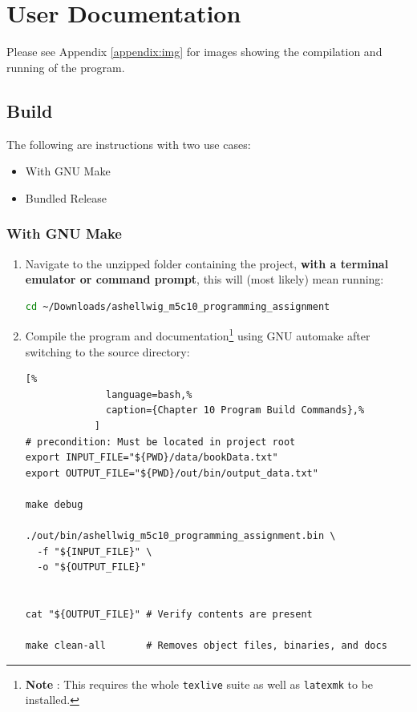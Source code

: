 \documentclass[a4paper, 11pt]{article}
\theoremstyle{definition}
\theoremstyle{plain}
\begin{document}
     


  \newpage
  \section{User Documentation}
    Please see Appendix \ref{appendix:img} for images showing the compilation
      and running of the program.

    \subsection{Build}
      The following are instructions with two use cases:
      \begin{itemize}
        \item With GNU Make
        \item Bundled Release
      \end{itemize}
      \subsubsection{With GNU Make}
        \begin{enumerate}
          \item Navigate to the unzipped folder containing the project,
            \textbf{with a terminal emulator or command prompt}, this will
            (most likely) mean running:
            \begin{lstlisting}[language=bash]
cd ~/Downloads/ashellwig_m5c10_programming_assignment
            \end{lstlisting}
          \item Compile the program and documentation\footnote{\textbf{Note%
            }: This requires the whole \texttt{texlive} suite as well as
            \texttt{latexmk} to be installed.} using GNU automake after
            switching to the source directory:
            \begin{lstlisting}[%
              language=bash,%
              caption={Chapter 10 Program Build Commands},%
            ]
# precondition: Must be located in project root
export INPUT_FILE="${PWD}/data/bookData.txt"
export OUTPUT_FILE="${PWD}/out/bin/output_data.txt"

make debug

./out/bin/ashellwig_m5c10_programming_assignment.bin \
  -f "${INPUT_FILE}" \
  -o "${OUTPUT_FILE}"


cat "${OUTPUT_FILE}" # Verify contents are present

make clean-all       # Removes object files, binaries, and docs
            \end{lstlisting}
          \end{enumerate}
\end{document}
